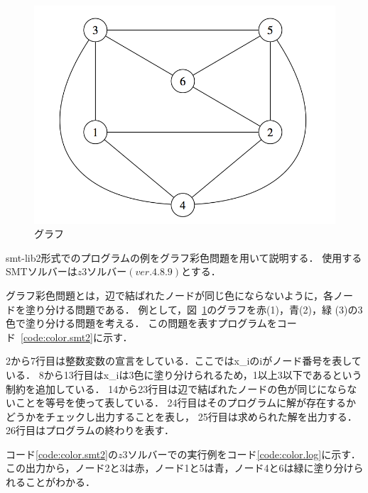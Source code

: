 %
%
\begin{figure}[tb]
  \centering
  \includegraphics[width=0.6\linewidth]{fig/graph.png}
  \caption{グラフ}
  \label{fig:graph}
\end{figure}
smt-lib2形式でのプログラムの例をグラフ彩色問題を用いて説明する．
使用するSMTソルバーは$z3ソルバー(ver.4.8.9)$とする．

グラフ彩色問題とは，辺で結ばれたノードが同じ色にならないように，各ノー
ドを塗り分ける問題である．
例として，図~\ref{fig:graph}のグラフを赤(1)，青(2)，緑
(3)の3色で塗り分ける問題を考える．
この問題を表すプログラムをコード~\ref{code:color.smt2}に示す．

2から7行目は整数変数の宣言をしている．ここではx\_iのiがノード番号を表している．
8から13行目はx\_iは3色に塗り分けられるため，1以上3以下であるという制約を追加している．
14から23行目は辺で結ばれたノードの色が同じにならないことを等号を使って表している．
24行目はそのプログラムに解が存在するかどうかをチェックし出力することを表し，
25行目は求められた解を出力する．
26行目はプログラムの終わりを表す．

コード\ref{code:color.smt2}の$z3ソルバー$での実行例をコード\ref{code:color.log}に示す．
この出力から，ノード2と3は赤，ノード1と5は青，ノード4と6は緑に塗り分けられることがわかる．








